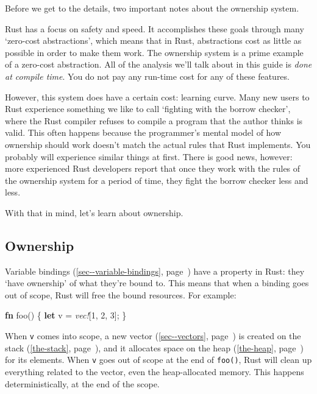 \documentclass[a4paper,]{book}
\renewcommand*{\hyperlink}[2]{%
 #2 (\autoref{#1}, page~\pageref{#1})}
\newenvironment{Shaded}{\begin{snugshade}}{\end{snugshade}}
\newcommand{\KeywordTok}[1]{\textcolor[rgb]{0.13,0.29,0.53}{\textbf{{#1}}}}
\newcommand{\DecValTok}[1]{\textcolor[rgb]{0.00,0.00,0.81}{{#1}}}
\newcommand{\PreprocessorTok}[1]{\textcolor[rgb]{0.56,0.35,0.01}{\textit{{#1}}}}
\newcommand{\NormalTok}[1]{{#1}}
\begin{document}
Before we get to the details, two important notes about the ownership
system.

Rust has a focus on safety and speed. It accomplishes these goals
through many `zero-cost abstractions', which means that in Rust,
abstractions cost as little as possible in order to make them work. The
ownership system is a prime example of a zero-cost abstraction. All of
the analysis we'll talk about in this guide is \emph{done at compile
time}. You do not pay any run-time cost for any of these features.

However, this system does have a certain cost: learning curve. Many new
users to Rust experience something we like to call `fighting with the
borrow checker', where the Rust compiler refuses to compile a program
that the author thinks is valid. This often happens because the
programmer's mental model of how ownership should work doesn't match the
actual rules that Rust implements. You probably will experience similar
things at first. There is good news, however: more experienced Rust
developers report that once they work with the rules of the ownership
system for a period of time, they fight the borrow checker less and
less.

With that in mind, let's learn about ownership.

\subsection{Ownership}\label{ownership}

\protect\hyperlink{sec--variable-bindings}{Variable bindings} have a
property in Rust: they `have ownership' of what they're bound to. This
means that when a binding goes out of scope, Rust will free the bound
resources. For example:

\begin{Shaded}
\begin{Highlighting}[]
\KeywordTok{fn} \NormalTok{foo() \{}
    \KeywordTok{let} \NormalTok{v = }\PreprocessorTok{vec!}\NormalTok{[}\DecValTok{1}\NormalTok{, }\DecValTok{2}\NormalTok{, }\DecValTok{3}\NormalTok{];}
\NormalTok{\}}
\end{Highlighting}
\end{Shaded}

When \texttt{v} comes into scope, a new
\protect\hyperlink{sec--vectors}{vector} is created on
\protect\hyperlink{the-stack}{the stack}, and it allocates space on
\protect\hyperlink{the-heap}{the heap} for its elements. When \texttt{v}
goes out of scope at the end of \texttt{foo()}, Rust will clean up
everything related to the vector, even the heap-allocated memory. This
happens deterministically, at the end of the scope.
\end{document}
